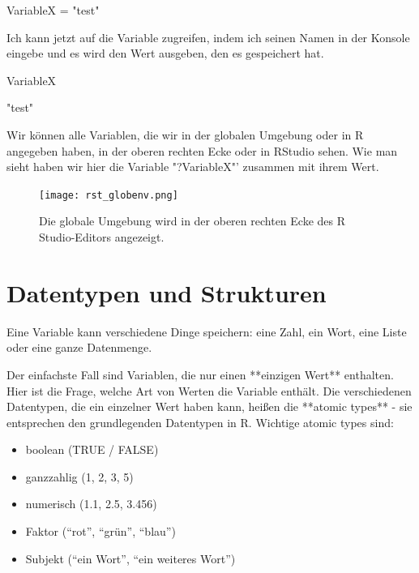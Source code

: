 \documentclass[a4paper,twoside]{tufte-book}\usepackage[]{graphicx}\usepackage[]{color}
\begin{document}
\begin{appendices}
\begin{Schunk}
\begin{Sinput}
VariableX = "test"
\end{Sinput}
\end{Schunk}


Ich kann jetzt auf die Variable zugreifen, indem ich seinen Namen in der Konsole eingebe und es wird den Wert ausgeben, den es gespeichert hat.

\begin{Schunk}
\begin{Sinput}
VariableX
\end{Sinput}
\begin{Soutput}
[1] "test"
\end{Soutput}
\end{Schunk}

Wir können alle Variablen, die wir in der globalen Umgebung oder in R angegeben haben, in der oberen rechten Ecke oder in RStudio sehen. Wie man sieht haben wir hier die Variable "?VariableX"' zusammen mit ihrem Wert.


\begin{figure}[]
\begin{center}
\texttt{[image: rst\_globenv.png]}
\caption{Die globale Umgebung wird in der oberen rechten Ecke des R Studio-Editors angezeigt.}
\label{fig: Rstudio}
\end{center}
\end{figure}

\section{Datentypen und Strukturen}

Eine Variable kann verschiedene Dinge speichern: eine Zahl, ein Wort, eine Liste oder eine ganze Datenmenge.

Der einfachste Fall sind Variablen, die nur einen **einzigen Wert** enthalten. Hier ist die Frage, welche Art von Werten die Variable enthält. Die verschiedenen Datentypen, die ein einzelner Wert haben kann, heißen die **atomic types** - sie entsprechen den grundlegenden Datentypen in R. Wichtige atomic types sind:

  \begin{itemize}
		\item boolean (TRUE / FALSE)
		\item ganzzahlig (1, 2, 3, 5)
		\item numerisch (1.1, 2.5, 3.456)
		\item Faktor ("`rot"', "`grün"', "`blau"')
		\item Subjekt ("`ein Wort"', "`ein weiteres Wort"')
	\end{itemize}


\end{appendices}
\end{document}
